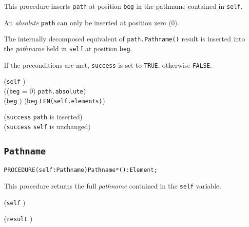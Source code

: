 \begin{semantics}
This procedure inserts \texttt{path} at position \texttt{beg} in the
pathname contained in \texttt{self}.

An \emph{absolute} \texttt{path} can only be inserted at position zero
(0).

The internally decomposed equivalent of \texttt{path.Pathname()} result
is inserted into the \emph{pathname} held in \texttt{self} at position
\texttt{beg}.

If the preconditions are met, \texttt{success} is set to
\texttt{TRUE}, otherwise \texttt{FALSE}.

\end{semantics}

\begin{precondition}
  (\texttt{self} \neq \nil) \logicaland {} \logicaland \\
  ((\texttt{beg} = 0) \logicalor \logicalnot \texttt{path.absolute}) \logicaland \\
    (\texttt{beg} ) \logicaland (\texttt{beg} \leq \texttt{LEN(self.elements\deref)})
\end{precondition}

\begin{postcondition}
  (\texttt{success} \implies {} \logicaland
  \texttt{path}\textrm{\xspace is inserted}) \logicalor \\
  (\logicalnot \texttt{success} \implies \texttt{self\deref}\textrm{\xspace is unchanged})
\end{postcondition}


\subsection{\texttt{Pathname}}\label{pathnames:pathname}
\begin{alltt}
  PROCEDURE (self : Pathname) Pathname*() : Element;
\end{alltt}

\begin{semantics}
  This procedure returns the full \emph{pathname} contained in the
  \texttt{self} variable.
\end{semantics}

\begin{precondition}
(\texttt{self} \neq \nil) \logicaland {}
\end{precondition}

\begin{postcondition}
(\texttt{result} \neq \nil) \logicaland {}
\end{postcondition}


